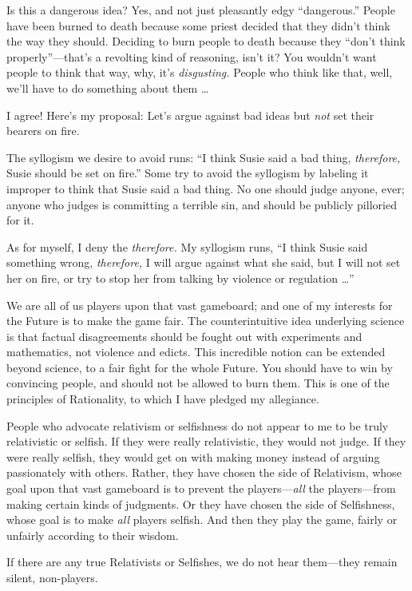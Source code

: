 {
 Is this a dangerous idea? Yes, and not just pleasantly edgy
``dangerous.'' People have been
burned to death because some priest decided that they
didn't think the way they should. Deciding to burn
people to death because they ``don't
think properly''---that's a revolting
kind of reasoning, isn't it? You
wouldn't want people to think that way, why,
it's \textit{disgusting.} People who think like that,
well, we'll have to do something about them \ldots}

{
 I agree! Here's my proposal: Let's
argue against bad ideas but \textit{not} set their bearers on fire.}

{
 The syllogism we desire to avoid runs: ``I think
Susie said a bad thing, \textit{therefore,} Susie should be set on
fire.'' Some try to avoid the syllogism by labeling
it improper to think that Susie said a bad thing. No one should judge
anyone, ever; anyone who judges is committing a terrible sin, and
should be publicly pilloried for it.}

{
 As for myself, I deny the \textit{therefore.} My syllogism runs,
``I think Susie said something wrong,
\textit{therefore,} I will argue against what she said, but I will not
set her on fire, or try to stop her from talking by violence or
regulation \ldots''}

{
 We are all of us players upon that vast gameboard; and one of my
interests for the Future is to make the game fair. The counterintuitive
idea underlying science is that factual disagreements should be fought
out with experiments and mathematics, not violence and edicts. This
incredible notion can be extended beyond science, to a fair fight for
the whole Future. You should have to win by convincing people, and
should not be allowed to burn them. This is one of the principles of
Rationality, to which I have pledged my allegiance.}

{
 People who advocate relativism or selfishness do not appear to me
to be truly relativistic or selfish. If they were really relativistic,
they would not judge. If they were really selfish, they would get on
with making money instead of arguing passionately with others. Rather,
they have chosen the side of Relativism, whose goal upon that vast
gameboard is to prevent the players---\textit{all} the players---from
making certain kinds of judgments. Or they have chosen the side of
Selfishness, whose goal is to make \textit{all} players selfish. And
then they play the game, fairly or unfairly according to their wisdom.}

{
 If there are any true Relativists or Selfishes, we do not hear
them---they remain silent, non-players.}


